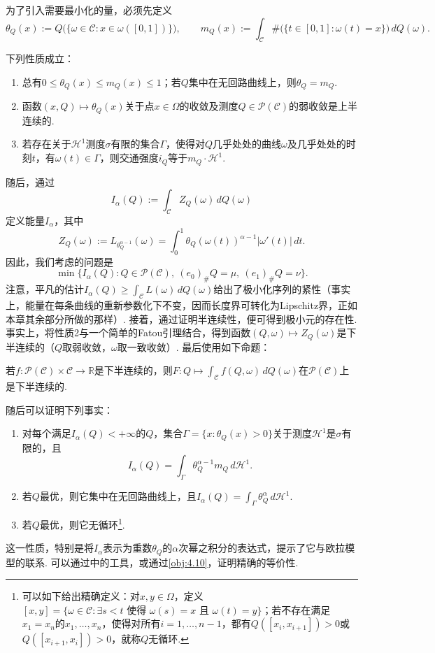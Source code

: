 为了引入需要最小化的量，必须先定义
\[
 \theta_Q(x):=Q\bigl(\{\omega\in \mathscr C:x\in\omega([0,1])\}\bigr),\qquad
 m_Q(x):=\int_\mathscr C\#\bigl(\{t\in[0,1]:\omega(t)=x\}\bigr)\,dQ(\omega).
\]
\begin{proposition}\label{obj:4.39}
下列性质成立：
\begin{enumerate}
 \item 总有$0\leq\theta_Q(x)\leq m_Q(x)\leq1$；若$Q$集中在无回路曲线上，则$\theta_Q=m_Q$.
 \item 函数$(x,Q)\mapsto\theta_Q(x)$关于点$x\in\Omega$的收敛及测度$Q\in\mathscr P(\mathscr C)$的弱收敛是上半连续的.
 \item 若存在关于$\mathscr H^1$测度$\sigma$有限的集合$\Gamma$，使得对$Q$几乎处处的曲线$\omega$及几乎处处的时刻$t$，有$\omega(t)\in\Gamma$，则交通强度$i_Q$等于$m_Q\cdot\mathscr H^1$.
\end{enumerate}
\end{proposition}
随后，通过
\[
 I_\alpha(Q):=\int_\mathscr C Z_Q(\omega)\,dQ(\omega)
\]
定义能量$I_\alpha$，其中
\[
 Z_Q(\omega):=L_{\theta_Q^{\alpha-1}}(\omega)
   =\int_0^1\theta_Q(\omega(t))^{\alpha-1}|\omega'(t)|\,dt.
\]
因此，我们考虑的问题是
\[
 \min\{I_\alpha(Q):Q\in\mathscr P(\mathscr C),\ (e_0)_\#Q=\mu,\ (e_1)_\#Q=\nu\}.
\]
注意，平凡的估计$I_\alpha(Q)\geq\int_\mathscr C L(\omega)\,dQ(\omega)$给出了极小化序列的紧性（事实上，能量在每条曲线的重新参数化下不变，因而长度界可转化为Lipschitz界，正如本章其余部分所做的那样）. 接着，通过证明半连续性，便可得到极小元的存在性. 事实上，将性质2与一个简单的Fatou引理结合，得到函数$(Q,\omega)\mapsto Z_Q(\omega)$是下半连续的（$Q$取弱收敛，$\omega$取一致收敛）. 最后使用如下命题：
\begin{proposition}\label{obj:4.40}
若$f:\mathscr P(\mathscr C)\times \mathscr C\to\mathbb R$是下半连续的，则$F:Q\mapsto\int_\mathscr C f(Q,\omega)\,dQ(\omega)$在$\mathscr P(\mathscr C)$上是下半连续的.
\end{proposition}
随后可以证明下列事实：
\begin{proposition}\leavevmode\label{obj:4.41}
\begin{enumerate}
 \item 对每个满足$I_\alpha(Q)<+\infty$的$Q$，集合$\Gamma=\{x:\theta_Q(x)>0\}$关于测度$\mathscr H^1$是$\sigma$有限的，且
 \[
 I_\alpha(Q)=\int_\Gamma\theta_Q^{\alpha-1}m_Q\,d\mathscr H^1.
 \]
 \item 若$Q$最优，则它集中在无回路曲线上，且$I_\alpha(Q)=\int_\Gamma\theta_Q^\alpha\,d\mathscr H^1$.
 \item 若$Q$最优，则它无循环\footnote{可以如下给出精确定义：对$x,y\in\Omega$，定义$[x,y]=\{\omega\in \mathscr C:\exists s<t\text{ 使得 }\omega(s)=x\text{ 且 }\omega(t)=y\}$；若不存在满足$x_1=x_n$的$x_1,\ldots,x_n$，使得对所有$i=1,\ldots,n-1$，都有$Q([x_i,x_{i+1}])>0$或$Q([x_{i+1},x_i])>0$，就称$Q$无循环.}.
\end{enumerate}
\end{proposition}
这一性质，特别是将$I_\alpha$表示为重数$\theta_Q$的$\alpha$次幂之积分的表达式，提示了它与欧拉模型的联系. 可以通过\cite{b48}中的工具，或通过\autoref{obj:4.10}，证明精确的等价性.

